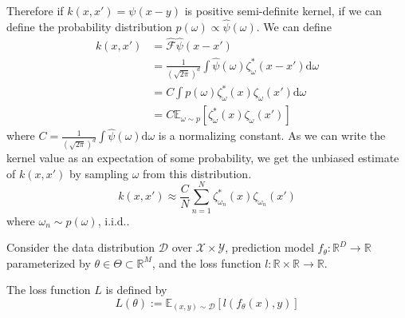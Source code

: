 

Therefore if $k(x, x') = \psi(x-y)$ is positive semi-definite kernel,
if we can define the probability distribution $p(\omega)\propto \hat{\psi}(\omega)$.
We can define 
\begin{equation}
\begin{split}
k(x, x') &= \hat{\mathcal{F}} \hat{\psi}(x-x') \\
         &= \frac{1}{(\sqrt{2\pi})^d} \int \hat{\psi}(\omega) \zeta_\omega^{\ast}(x-x') \mathrm{d}\omega\\
         &= C \int p(\omega) \zeta_\omega^{\ast}(x) \zeta_\omega(x') \mathrm{d}\omega\\
         &= C \mathbb{E}_{\omega\sim p}\left[\zeta_\omega^{\ast}(x) \zeta_\omega(x')\right]
\end{split}
\end{equation}
where $C=\frac{1}{(\sqrt{2\pi})^d}\int \hat{\psi}(\omega)\mathrm{d}\omega$ is a normalizing constant.
As we can write the kernel value as an expectation of some probability,
we get the unbiased estimate of $k(x, x')$ by sampling $\omega$ from this distribution.
\begin{equation}
k(x, x') \approx \frac{C}{N} \sum_{n=1}^{N} \zeta_{\omega_n}^{\ast}(x) \zeta_{\omega_n}(x')
\end{equation}
where $\omega_n \sim p(\omega)$, i.i.d..

Consider the data distribution $\mathcal{D}$ over $\mathcal{X} \times \mathcal{Y}$,
prediction model $f_\theta: \mathbb{R}^D \to \mathbb{R}$ parameterized by $\theta\in \Theta \subset \mathbb{R}^M$,
and the loss function $l: \mathbb{R}\times \mathbb{R}\to \mathbb{R}$.

The loss function $L$ is defined by
\begin{equation}
L(\theta) := \mathbb{E}_{(x, y)\sim \mathcal{D}}\left[ l(f_\theta(x), y) \right]
\end{equation}

